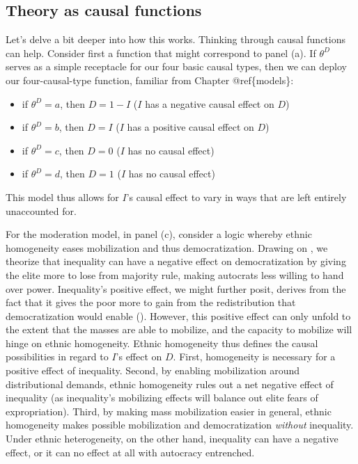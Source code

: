 \documentclass[12pt,]{book}
\providecommand{\tightlist}{%
  \setlength{\itemsep}{0pt}\setlength{\parskip}{0pt}}
\begin{document}
\hypertarget{theory-as-causal-functions}{%
\subsection{Theory as causal functions}\label{theory-as-causal-functions}}

Let's delve a bit deeper into how this works. Thinking through causal functions can help. Consider first a function that might correspond to panel (a). If \(\theta^D\) serves as a simple receptacle for our four basic causal types, then we can deploy our four-causal-type function, familiar from Chapter @ref\{models\}:

\begin{itemize}
\tightlist
\item
  if \(\theta^D=a\), then \(D=1-I\) (\(I\) has a negative causal effect on \(D\))
\item
  if \(\theta^D=b\), then \(D=I\) (\(I\) has a positive causal effect on \(D\))
\item
  if \(\theta^D=c\), then \(D=0\) (\(I\) has no causal effect)
\item
  if \(\theta^D=d\), then \(D=1\) (\(I\) has no causal effect)
\end{itemize}

This model thus allows for \(I\)'s causal effect to vary in ways that are left entirely unaccounted for.

For the moderation model, in panel (c), consider a logic whereby ethnic homogeneity eases mobilization and thus democratization. Drawing on \citet{boix2003democracy}, we theorize that inequality can have a negative effect on democratization by giving the elite more to lose from majority rule, making autocrats less willing to hand over power. Inequality's positive effect, we might further posit, derives from the fact that it gives the poor more to gain from the redistribution that democratization would enable (\citet{acemoglu2005economic}). However, this positive effect can only unfold to the extent that the masses are able to mobilize, and the capacity to mobilize will hinge on ethnic homogeneity. Ethnic homogeneity thus defines the causal possibilities in regard to \(I\)'s effect on \(D\). First, homogeneity is necessary for a positive effect of inequality. Second, by enabling mobilization around distributional demands, ethnic homogeneity rules out a net negative effect of inequality (as inequality's mobilizing effects will balance out elite fears of expropriation). Third, by making mass mobilization easier in general, ethnic homogeneity makes possible mobilization and democratization \emph{without} inequality. Under ethnic heterogeneity, on the other hand, inequality can have a negative effect, or it can no effect at all with autocracy entrenched.
\end{document}
